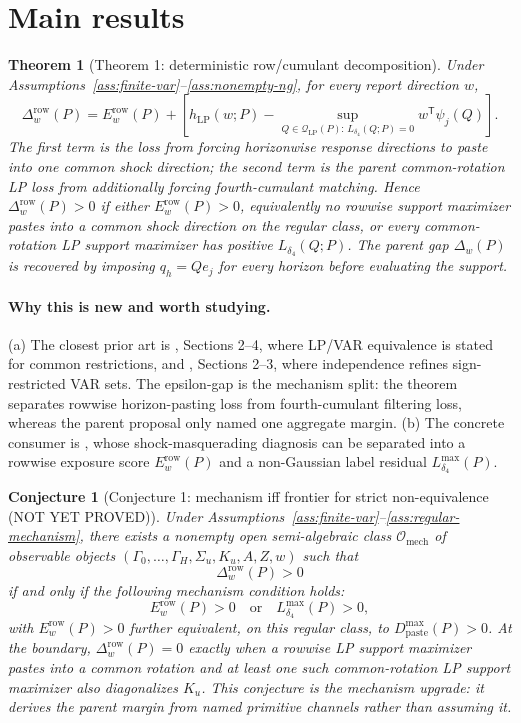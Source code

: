 \documentclass[11pt]{article}
\newcommand{\transpose}{\mathsf{T}}
\theoremstyle{definition}
\theoremstyle{plain}
\newtheorem{theorem}{Theorem}
\newtheorem{conjecture}{Conjecture}
\theoremstyle{remark}
\begin{document}
\section{Main results}
\begin{theorem}[Theorem 1: deterministic row/cumulant decomposition]\label{thm:decomposition-identity}
Under Assumptions~\ref{ass:finite-var}--\ref{ass:nonempty-ng}, for every report direction \(w\),
\[
\Delta_w^{\mathrm{row}}(P)
=E_w^{\mathrm{row}}(P)+
\left[h_{\mathrm{LP}}(w;P)-\sup_{Q\in\mathcal Q_{\mathrm{LP}}(P):\,L_{\delta_4}(Q;P)=0}w^\transpose\psi_j(Q)\right].
\]
The first term is the loss from forcing horizonwise response directions to paste into one common shock direction; the second term is the parent common-rotation LP loss from additionally forcing fourth-cumulant matching.  Hence \(\Delta_w^{\mathrm{row}}(P)>0\) if either \(E_w^{\mathrm{row}}(P)>0\), equivalently no rowwise support maximizer pastes into a common shock direction on the regular class, or every common-rotation LP support maximizer has positive \(L_{\delta_4}(Q;P)\).  The parent gap \(\Delta_w(P)\) is recovered by imposing \(q_h=Qe_j\) for every horizon before evaluating the support.
\end{theorem}
\paragraph{Why this is new and worth studying.}
(a) The closest prior art is \citet{PlagborgMollerWolf2021}, Sections 2--4, where LP/VAR equivalence is stated for common restrictions, and \citet{DrautzburgWright2023}, Sections 2--3, where independence refines sign-restricted VAR sets.  The epsilon-gap is the mechanism split: the theorem separates rowwise horizon-pasting loss from fourth-cumulant filtering loss, whereas the parent proposal only named one aggregate margin.  (b) The concrete consumer is \citet{Wolf2022}, whose shock-masquerading diagnosis can be separated into a rowwise exposure score \(E_w^{\mathrm{row}}(P)\) and a non-Gaussian label residual \(L_{\delta_4}^{\max}(P)\).

\begin{conjecture}[Conjecture 1: mechanism iff frontier for strict non-equivalence (NOT YET PROVED)]\label{conj:mechanism-iff}
Under Assumptions~\ref{ass:finite-var}--\ref{ass:regular-mechanism}, there exists a nonempty open semi-algebraic class \(\mathcal O_{\mathrm{mech}}\) of observable objects \((\Gamma_0,\ldots,\Gamma_H,\Sigma_u,K_u,A,Z,w)\) such that
\[
\Delta_w^{\mathrm{row}}(P)>0
\]
if and only if the following mechanism condition holds:
\[
E_w^{\mathrm{row}}(P)>0
\quad\text{or}\quad
L_{\delta_4}^{\max}(P)>0,
\]
with \(E_w^{\mathrm{row}}(P)>0\) further equivalent, on this regular class, to \(D_{\mathrm{paste}}^{\max}(P)>0\).  At the boundary, \(\Delta_w^{\mathrm{row}}(P)=0\) exactly when a rowwise LP support maximizer pastes into a common rotation and at least one such common-rotation LP support maximizer also diagonalizes \(K_u\).  This conjecture is the mechanism upgrade: it derives the parent margin from named primitive channels rather than assuming it.
\end{conjecture}
\end{document}
